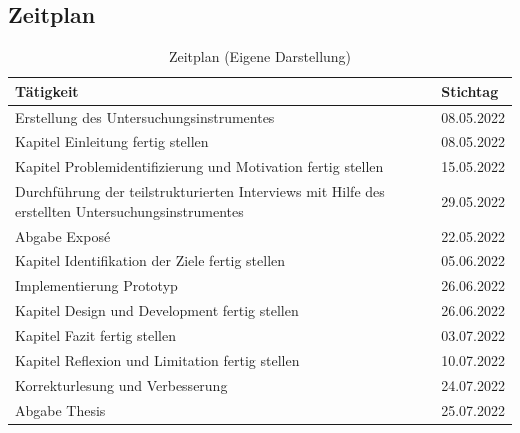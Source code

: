 \documentclass[12pt, oneside]{article}
\begin{document}
\subsection*{Zeitplan}

\begin{table}[ht]
\begin{tabular}{@{}p{13cm}p{2cm}@{}}
\toprule
\textbf{Tätigkeit}                                                                                & \textbf{Stichtag} \\ \midrule
Erstellung des Untersuchungsinstrumentes                                                          & 08.05.2022        \\ \midrule
Kapitel Einleitung fertig stellen                                                                 & 08.05.2022        \\ \midrule
Kapitel Problemidentifizierung und Motivation fertig stellen                                      & 15.05.2022        \\ \midrule
Durchführung der teilstrukturierten Interviews mit Hilfe des erstellten Untersuchungsinstrumentes & 29.05.2022        \\ \midrule
Abgabe Exposé                                                                                     & 22.05.2022        \\ \midrule
Kapitel Identifikation der Ziele fertig stellen                                                   & 05.06.2022        \\ \midrule
Implementierung Prototyp                                                                          & 26.06.2022        \\ \midrule
Kapitel Design und Development fertig stellen                                                     & 26.06.2022        \\ \midrule
Kapitel Fazit fertig stellen                                                                      & 03.07.2022        \\ \midrule
Kapitel Reflexion und Limitation fertig stellen                                                   & 10.07.2022        \\ \midrule
Korrekturlesung und Verbesserung                                                                  & 24.07.2022        \\ \midrule
Abgabe Thesis                                                                                     & 25.07.2022        \\ \bottomrule
\end{tabular}
\caption{\label{tab:time-table}Zeitplan (Eigene Darstellung)}
\end{table}
\end{document}

